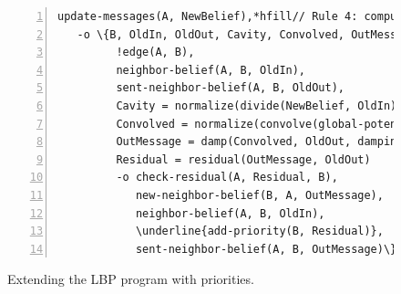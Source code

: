 \begin{figure}[h!]
\begin{Verbatim}[numbers=left,commandchars=\\\{\},fontsize=\codesize]
update-messages(A, NewBelief),*hfill// Rule 4: compute belief to be sent to a neighbor node
   -o \{B, OldIn, OldOut, Cavity, Convolved, OutMessage, Residual |
         !edge(A, B),
         neighbor-belief(A, B, OldIn),
         sent-neighbor-belief(A, B, OldOut),
         Cavity = normalize(divide(NewBelief, OldIn)),
         Convolved = normalize(convolve(global-potential, Cavity)),
         OutMessage = damp(Convolved, OldOut, damping)
         Residual = residual(OutMessage, OldOut)
         -o check-residual(A, Residual, B),
            new-neighbor-belief(B, A, OutMessage),
            neighbor-belief(A, B, OldIn),
            \underline{add-priority(B, Residual)},
            sent-neighbor-belief(A, B, OutMessage)\}.
\end{Verbatim}
\caption{Extending the LBP program with priorities.}
\label{code:coordination:improved_bp}
\end{figure}
